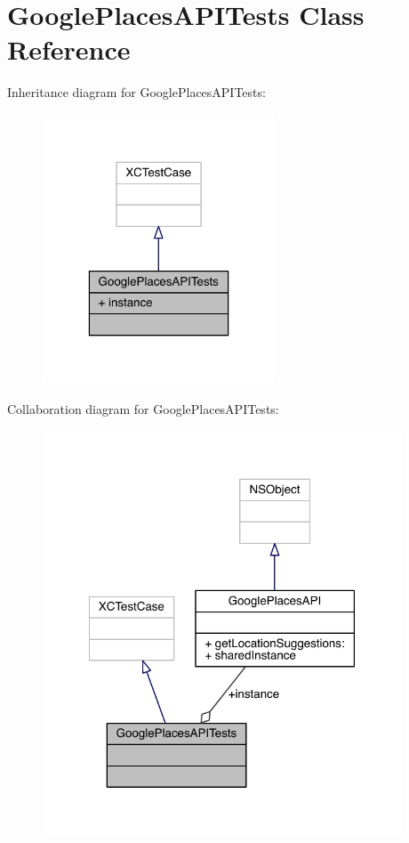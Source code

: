 \hypertarget{interface_google_places_a_p_i_tests}{\section{Google\-Places\-A\-P\-I\-Tests Class Reference}
\label{interface_google_places_a_p_i_tests}
}


Inheritance diagram for Google\-Places\-A\-P\-I\-Tests\-:\nopagebreak
\begin{figure}[H]
\begin{center}
\leavevmode
\includegraphics[width=196pt]{interface_google_places_a_p_i_tests__inherit__graph}
\end{center}
\end{figure}


Collaboration diagram for Google\-Places\-A\-P\-I\-Tests\-:\nopagebreak
\begin{figure}[H]
\begin{center}
\leavevmode
\includegraphics[width=303pt]{interface_google_places_a_p_i_tests__coll__graph}
\end{center}
\end{figure}
